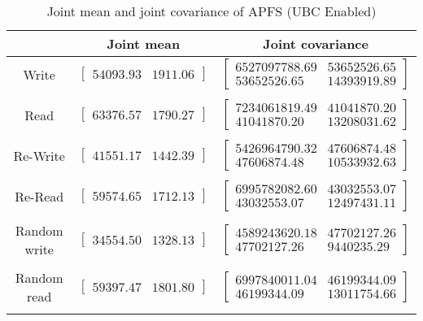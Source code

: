 
	\begin{table}
	\caption{Joint mean and joint covariance of APFS (UBC Enabled)}
	\begin{tabular}{| c | c | c |}
	\hline
	{} & \textbf{Joint mean} & \textbf{Joint covariance}\\
	\hline
	\hline
Write & $\left[ \begin{array}{rr} 54093.93 & 1911.06 \end{array}\right] $ & $\left[ \begin{array}{rr} 6527097788.69 & 53652526.65 \\ 53652526.65 & 14393919.89 \end{array}\right] $\\ 
{} & {} & {} \\ 
Read & $\left[ \begin{array}{rr} 63376.57 & 1790.27 \end{array}\right] $ & $\left[ \begin{array}{rr} 7234061819.49 & 41041870.20 \\ 41041870.20 & 13208031.62 \end{array}\right] $\\ 
{} & {} & {} \\ 
Re-Write & $\left[ \begin{array}{rr} 41551.17 & 1442.39 \end{array}\right] $ & $\left[ \begin{array}{rr} 5426964790.32 & 47606874.48 \\ 47606874.48 & 10533932.63 \end{array}\right] $\\ 
{} & {} & {} \\ 
Re-Read & $\left[ \begin{array}{rr} 59574.65 & 1712.13 \end{array}\right] $ & $\left[ \begin{array}{rr} 6995782082.60 & 43032553.07 \\ 43032553.07 & 12497431.11 \end{array}\right] $\\ 
{} & {} & {} \\ 
Random write & $\left[ \begin{array}{rr} 34554.50 & 1328.13 \end{array}\right] $ & $\left[ \begin{array}{rr} 4589243620.18 & 47702127.26 \\ 47702127.26 & 9440235.29 \end{array}\right] $\\ 
{} & {} & {} \\ 
Random read & $\left[ \begin{array}{rr} 59397.47 & 1801.80 \end{array}\right] $ & $\left[ \begin{array}{rr} 6997840011.04 & 46199344.09 \\ 46199344.09 & 13011754.66 \end{array}\right] $\\ 
{} & {} & {} \\ 

	\hline
	\end{tabular}
	\label{tbl:stat-apfs_ubc_enabled}
	\end{table}
